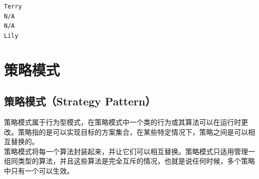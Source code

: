 \begin{tcolorbox}
    \begin{verbatim}
Terry
N/A
N/A
Lily
\end{verbatim}
\end{tcolorbox}

\newpage

\section{策略模式}

\subsection{策略模式（Strategy Pattern）}

策略模式属于行为型模式，在策略模式中一个类的行为或其算法可以在运行时更改。策略指的是可以实现目标的方案集合，在某些特定情况下，策略之间是可以相互替换的。\\

策略模式将每一个算法封装起来，并让它们可以相互替换。策略模式只适用管理一组同类型的算法，并且这些算法是完全互斥的情况，也就是说任何时候，多个策略中只有一个可以生效。\\

\\

